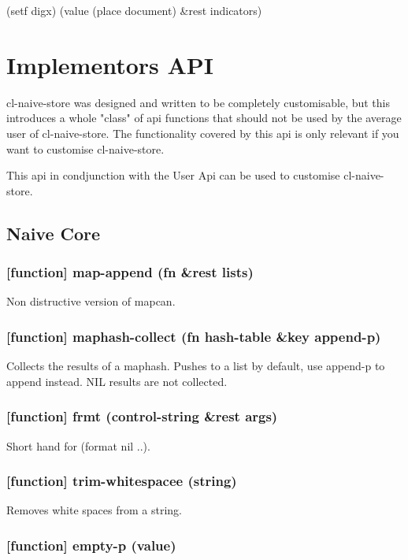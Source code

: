 \documentclass[11pt]{article}
\begin{document}
(setf digx) (value (place document) \&rest indicators)

\section{Implementors API}
\label{sec:orgaf6ddd2}

cl-naive-store was designed and written to be completely customisable,
but this introduces a whole "class" of api functions that should not
be used by the average user of cl-naive-store. The functionality
covered by this api is only relevant if you want to customise
cl-naive-store.

This api in condjunction with the User Api can be used
to customise cl-naive-store.

\subsection{Naive Core}
\label{sec:org67089cd}

\subsubsection{[function] map-append (fn \&rest lists)}
\label{sec:orgc1b2361}

Non distructive version of mapcan.

\subsubsection{[function] maphash-collect (fn hash-table \&key append-p)}
\label{sec:org8f7397e}

Collects the results of a maphash. Pushes to a list by default, use
append-p to append instead. NIL results are not collected.

\subsubsection{[function] frmt (control-string \&rest args)}
\label{sec:orgf5a523e}

Short hand for (format nil ..).

\subsubsection{[function] trim-whitespacee (string)}
\label{sec:org373f870}

Removes white spaces from a string.

\subsubsection{[function] empty-p (value)}
\label{sec:org023c1f8}
\end{document}
